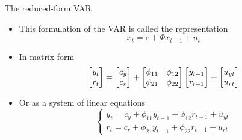 \documentclass[10pt,handout]{beamer}
\begin{document}
\begin{frame}
{The reduced-form VAR}
\begin{itemize}
\item This formulation of the VAR is called the 
representation
\begin{equation*}
x_{t}=c+\Phi x_{t-1}+u_{t}
\end{equation*}%
\pause
\item In matrix form%
\begin{equation*}
\begin{bmatrix}
y_{t} \\
r_{t}%
\end{bmatrix}%
=%
\begin{bmatrix}
c_y \\
c_r%
\end{bmatrix}%
+%
\begin{bmatrix}
\phi _{11} & \phi _{12} \\
\phi _{21} & \phi _{22}%
\end{bmatrix}%
\begin{bmatrix}
y_{t-1} \\
r_{t-1}%
\end{bmatrix}%
+%
\begin{bmatrix}
u_{yt} \\
u_{rt}%
\end{bmatrix}%
\medskip
\end{equation*}
\item Or as a system of linear equations%
\begin{equation*}
\left\{
\begin{array}{c}
y_{t}=c_y+\phi _{11}y_{t-1}+\phi _{12}r_{t-1}+u_{yt} \\
r_{t}=c_r+\phi _{21}y_{t-1}+\phi _{22}r_{t-1}+u_{rt}%
\end{array}%
\right.
\end{equation*}
\end{itemize}
\end{frame}
\shownotesblock{}
\end{document}
